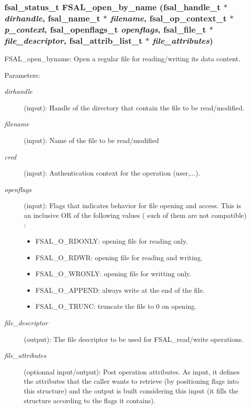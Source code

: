 \subsubsection[{FSAL\_\-open\_\-by\_\-name}]{\setlength{\rightskip}{0pt plus 5cm}fsal\_\-status\_\-t FSAL\_\-open\_\-by\_\-name (fsal\_\-handle\_\-t $\ast$ {\em dirhandle}, \/  fsal\_\-name\_\-t $\ast$ {\em filename}, \/  fsal\_\-op\_\-context\_\-t $\ast$ {\em p\_\-context}, \/  fsal\_\-openflags\_\-t {\em openflags}, \/  fsal\_\-file\_\-t $\ast$ {\em file\_\-descriptor}, \/  fsal\_\-attrib\_\-list\_\-t $\ast$ {\em file\_\-attributes})}\label{fsal__fileop_8c_6c899c64e18d90528a018989cc2484c5}


FSAL\_\-open\_\-byname: Open a regular file for reading/writing its data content.

\begin{Desc}
\item[Parameters:]
\begin{description}
\item[{\em dirhandle}](input): Handle of the directory that contain the file to be read/modified. \item[{\em filename}](input): Name of the file to be read/modified \item[{\em cred}](input): Authentication context for the operation (user,...). \item[{\em openflags}](input): Flags that indicates behavior for file opening and access. This is an inclusive OR of the following values ( such of them are not compatible) :\begin{itemize}
\item FSAL\_\-O\_\-RDONLY: opening file for reading only.\item FSAL\_\-O\_\-RDWR: opening file for reading and writing.\item FSAL\_\-O\_\-WRONLY: opening file for writting only.\item FSAL\_\-O\_\-APPEND: always write at the end of the file.\item FSAL\_\-O\_\-TRUNC: truncate the file to 0 on opening. \end{itemize}
\item[{\em file\_\-descriptor}](output): The file descriptor to be used for FSAL\_\-read/write operations. \item[{\em file\_\-attributes}](optionnal input/output): Post operation attributes. As input, it defines the attributes that the caller wants to retrieve (by positioning flags into this structure) and the output is built considering this input (it fills the structure according to the flags it contains).\end{description}
\end{Desc}
